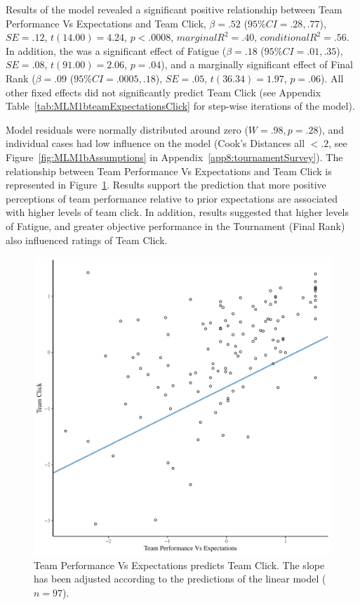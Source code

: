 \begin{CJK}{UTF8}{gbsn}
Results of the model revealed a significant positive relationship between Team Performance Vs Expectations and Team Click, $\beta = .52$ ($95\% CI =  .28, .77$), $SE = .12$, $t(14.00) = 4.24$, $p < .0008$, $marginal R^2 = .40$, $conditional R^2 = .56$.  In addition, the was a significant effect of Fatigue ($\beta = .18$ ($95\% CI =  .01, .35$), $SE = .08$, $t(91.00) = 2.06$, $p = .04$), and a marginally significant effect of Final Rank ($\beta = .09$ ($95\% CI =  .0005, .18$), $SE = .05$, $t(36.34) = 1.97$, $p = .06$).  All other fixed effects did not significantly predict Team Click (see Appendix  Table~\ref{tab:MLM1bteamExpectationsClick} for step-wise iterations of the model).

Model residuals were normally distributed around zero ($W = .98, p = .28$), and individual cases had low influence on the model (Cook's Distances all $< .2$, see Figure~\ref{fig:MLM1bAssumptions} in Appendix~\ref{app8:tournamentSurvey}).  The relationship between Team Performance Vs Expectations and Team Click is represented in Figure~\ref{fig:teamPerfClickModelSlope}.  Results support the prediction that more positive perceptions of team performance relative to prior expectations are associated with higher levels of team click.   In addition, results suggested that higher levels of Fatigue, and greater objective performance in the Tournament (Final Rank) also influenced ratings of Team Click.


  \begin{figure}[htbp]
    \centering
  \includegraphics[scale=.5]{images/teamPerfClickModelSlope.pdf}
    \caption{Team Performance Vs Expectations predicts Team Click. The slope has been adjusted according to the predictions of the linear model ($n = 97$).}
    \label{fig:teamPerfClickModelSlope}
  \end{figure}






\end{CJK}

